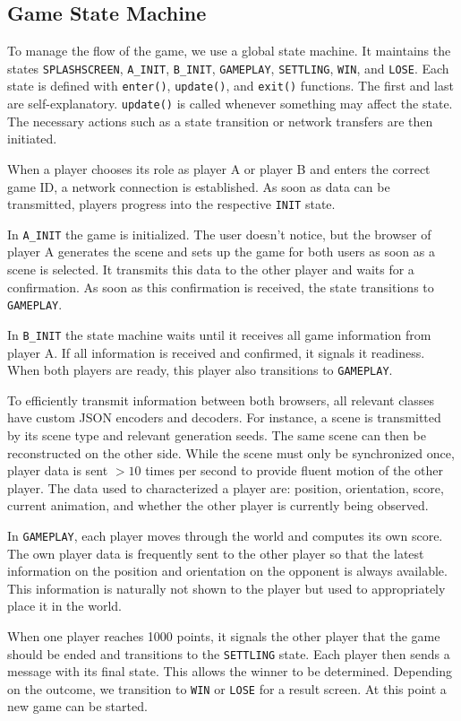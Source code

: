 \documentclass[11pt]{article}
\begin{document}
\subsection{Game State Machine}
\par To manage the flow of the game, we use a global state machine. It maintains the states \texttt{SPLASHSCREEN}, \texttt{A\_INIT}, \texttt{B\_INIT}, \texttt{GAMEPLAY}, \texttt{SETTLING}, \texttt{WIN}, and \texttt{LOSE}. Each state is defined with \texttt{enter()}, \texttt{update()}, and \texttt{exit()} functions. The first and last are self-explanatory. \texttt{update()} is called whenever something may affect the state. The necessary actions such as a state transition or network transfers are then initiated.
\par When a player chooses its role as player A or player B and enters the correct game ID, a network connection is established. As soon as data can be transmitted, players progress into the respective \texttt{INIT} state.
\par In \texttt{A\_INIT} the game is initialized. The user doesn't notice, but the browser of player A generates the scene and sets up the game for both users as soon as a scene is selected. It transmits this data to the other player and waits for a confirmation. As soon as this confirmation is received, the state transitions to \texttt{GAMEPLAY}.
\par In \texttt{B\_INIT} the state machine waits until it receives all game information from player A. If all information is received and confirmed, it signals it readiness. When both players are ready, this player also transitions to \texttt{GAMEPLAY}.
\par To efficiently transmit information between both browsers, all relevant classes have custom JSON encoders and decoders. For instance, a scene is transmitted by its scene type and relevant generation seeds. The same scene can then be reconstructed on the other side. While the scene must only be synchronized once, player data is sent $>10$ times per second to provide fluent motion of the other player. The data used to characterized a player are: position, orientation, score, current animation, and whether the other player is currently being observed.
\par In \texttt{GAMEPLAY}, each player moves through the world and computes its own score. The own player data is frequently sent to the other player so that the latest information on the position and orientation on the opponent is always available. This information is naturally not shown to the player but used to appropriately place it in the world.
\par When one player reaches 1000 points, it signals the other player that the game should be ended and transitions to the \texttt{SETTLING} state. Each player then sends a message with its final state. This allows the winner to be determined. Depending on the outcome, we transition to \texttt{WIN} or \texttt{LOSE} for a result screen. At this point a new game can be started.
\end{document}
